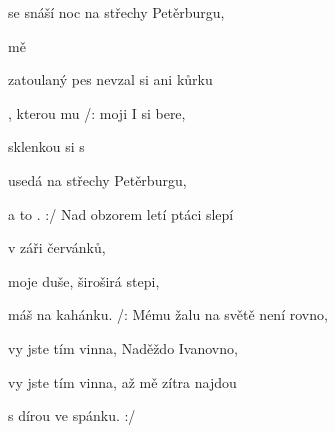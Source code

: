 

\zs
{} se snáší noc na střechy Petěrburgu,

  mě 

zatoulaný pes nevzal si ani kůrku

, kterou  mu 
\ks
\zr
/:  moji  I si bere,


 sklenkou   si s 

 usedá na střechy Petěrburgu,

 a to . :/
\kr
\zs
Nad obzorem letí ptáci slepí

v záři červánků,

moje duše, široširá stepi,

máš na kahánku.
\ks
\zr
/: Mému žalu na světě není rovno,

vy jste tím vinna, Naděždo Ivanovno,

vy jste tím vinna, až mě zítra najdou

s dírou ve spánku. :/
\kr
\kp





